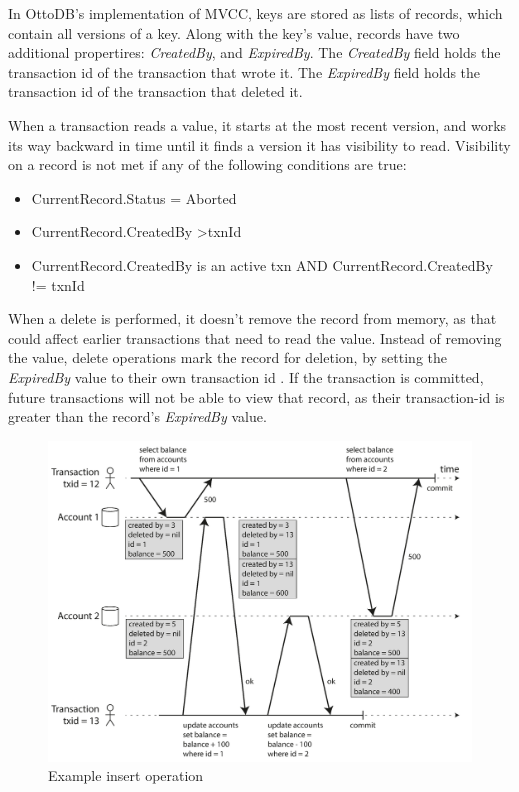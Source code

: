 \documentclass[conference]{IEEEtran}
\begin{document}
    In OttoDB's implementation of MVCC, keys are stored as lists of records, which contain all versions of a key. Along with the key's value, records have two additional propertires: \textit{CreatedBy}, and \textit{ExpiredBy}. The \textit{CreatedBy} field holds the transaction id of the transaction that wrote it. The \textit{ExpiredBy} field holds the transaction id of the transaction that deleted it. 
    
    When a transaction reads a value, it starts at the most recent version, and works its way backward in time until it finds a version it has visibility to read. Visibility on a record is not met if any of the following conditions are true:

    \begin{itemize}
        \item CurrentRecord.Status = Aborted
        \item CurrentRecord.CreatedBy \textgreater \space txnId
        \item CurrentRecord.CreatedBy is an active txn AND CurrentRecord.CreatedBy != txnId 
    \end{itemize}


    When a delete is performed, it doesn't remove the record from memory, as that could affect earlier transactions that need to read the value. Instead of removing the value, delete operations mark the record for deletion, by setting the \textit{ExpiredBy} value to their own transaction id \cite[p. 240]{b18}. If the transaction is committed, future transactions will not be able to view that record, as their transaction-id is greater than the record's \textit{ExpiredBy} value. 

    \begin{figure}[h]
        \centering
        \includegraphics[width=\columnwidth]{figures/MVCCInAction.png}
        \caption{Example insert operation \cite[p. 240]{b18}}
        \end{figure}
\end{document}
